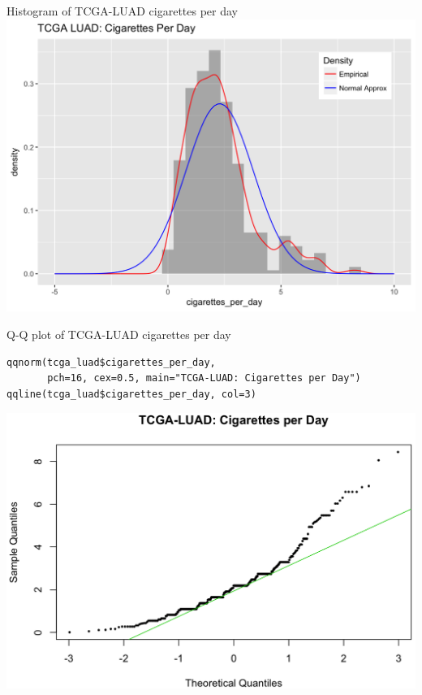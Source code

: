 \documentclass[12pt, t, xcolor=dvipsnames]{beamer}
\begin{document}
\begin{frame}{Histogram of TCGA-LUAD cigarettes per day}
\includegraphics[width=\textwidth, keepaspectratio]{histCpd}
\end{frame}


\begin{frame}[fragile]{Q-Q plot of TCGA-LUAD cigarettes per day}
\begin{verbatim}
qqnorm(tcga_luad$cigarettes_per_day, 
       pch=16, cex=0.5, main="TCGA-LUAD: Cigarettes per Day")
qqline(tcga_luad$cigarettes_per_day, col=3)
\end{verbatim}
\includegraphics[height=0.6\textheight, keepaspectratio]{qqCpd}
\end{frame}
\end{document}
